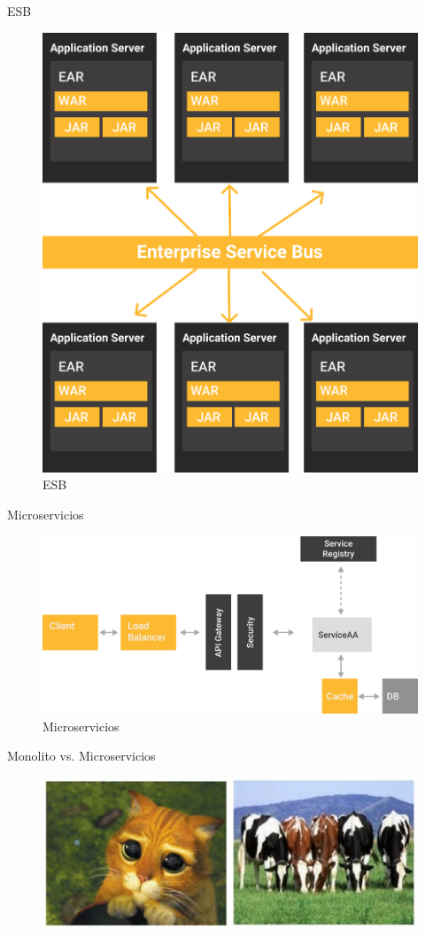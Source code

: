 \documentclass{beamer}
\begin{document}
\begin{frame}{ESB}
\begin{figure}
	\centering
	\includegraphics[width=0.5\linewidth]{Images/esb}
	\caption{ESB}
\end{figure}
\end{frame}

\begin{frame}{Microservicios}
\begin{figure}
\centering
\includegraphics[width=\linewidth]{Images/microservicios}
\caption{Microservicios}
\end{figure}
\end{frame}

\begin{frame}{Monolito vs. Microservicios}
\begin{figure}
	\centering
	\includegraphics[width=\linewidth]{Images/petvscattle}
\end{figure}
\end{frame}
\end{document}
